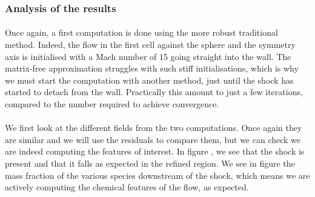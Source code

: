       \subsubsection{Analysis of the results}

        \paragraph{}
        Once again, a first computation is done using the more robust traditional method.
        Indeed, the flow in the first cell against the sphere and the symmetry axis is initialised with a Mach number of 15 going straight into the wall.
        The matrix-free approximation struggles with such stiff initialisations, which is why we must start the computation with another method, just until the shock has started to detach from the wall.
        Practically this amount to just a few iterations, compared to the number required to achieve convergence.

        \paragraph{}
        We first look at the different fields from the two computations.
        Once again they are similar and we will use the residuals to compare them, but we can check we are indeed computing the features of interest.
        In figure , we see that the shock is present and that it falls as expected in the refined region.
        We see in figure  the mass fraction of the various species downstream of the shock, which means we are actively computing the chemical features of the flow, as expected.

